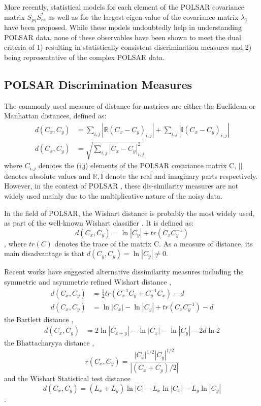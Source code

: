 \documentclass[journal,12pt,draftcls,onecolumn]{IEEEtran}
\begin{document}
More recently, statistical models for
  each element of the POLSAR covariance matrix $S_{pq}S_{rs}^*$ \cite{Lopez-Martinez_2003_TGRS_2232}
  as well as for the largest eigen-value of the covariance matrix $\lambda_1$ \cite{Erten_2012_Sensors_2766} have been proposed.
While these models undoubtedly help in understanding POLSAR data,
  none of these observables have been shown to meet the dual criteria of
  1) resulting in statistically consistent discrimination measures and
  2) being representative of the complex POLSAR data.

\subsection{POLSAR Discrimination Measures}
\label{sec:lit_measures}

The commonly used measure of distance for matrices are either the Euclidean or Manhattan distances, defined as:
\begin{align}
  d(C_x,C_y) &= \sum_{i,j} |\mathbb{R} (C_x - C_y)_{i,j}| + \sum_{i,j} |\mathbb{I} (C_x - C_y)_{i,j}| \\
  d(C_x,C_y) &= \sqrt{\sum_{i,j} |C_x - C_y|_{i,j}^2 }
\end{align}
where $C_{i,j}$ denotes the (i,j) elements of the POLSAR covariance matrix C,
 $||$ denotes absolute values
and $\mathbb{R},\mathbb{I}$ denote the real and imaginary parts respectively.
However, in the context of POLSAR%
, these dis-similarity measures are not widely used 
  mainly due to the multiplicative nature of the noisy data.

In the field of POLSAR, the Wishart distance is probably the most widely used, as part of the well-known Wishart classifier \cite{Lee_1999_TGRS}.
It is defined \cite{Lee_1994_IJRS_2299} as:
\begin{equation}
  d(C_x,C_y) = \ln|C_y| + tr(C_xC_y^{-1})
\end{equation},
where $tr(C)$ denotes the trace of the matrix C. 
As a measure of distance, its main disadvantage is that $d(C_y,C_y) = \ln|C_y| \neq 0$.

Recent works have suggested alternative dissimilarity measures including the symmetric and asymmetric refined Wishart distance \cite{Anfinsen_2007_ESA_POLINSAR},
\begin{align}
  d(C_x,C_y) &= \frac{1}{2} tr(C_x^{-1}C_y + C_y^{-1}C_x) - d \\
    d(C_x,C_y) &= \ln|C_x| - \ln|C_y| + tr(C_xC_y^{-1}) - d
\end{align}
the Bartlett distance \cite{Kersten_2005_TGRS_519},
  \begin{align}
  d(C_x,C_y) &= 2 \ln |C_{x+y}| - \ln |C_x| - \ln |C_y| - 2d\ln2
  \end{align}
the Bhattacharyya distance \cite{Lee_2011_IGARSS_3740},
\begin{equation}
  r(C_x,C_y) = \frac{|C_x|^{1/2} |C_y|^{1/2}}{|(C_x+C_y)/2|}
\end{equation}
and the Wishart Statistical test distance \cite{Cao_2007_TGRS_3454}
\begin{equation}
  d(C_x,C_y) = (L_x + L_y) \ln|C| - L_x \ln|C_x| - L_y\ln|C_y|
\end{equation}
.
\end{document}
